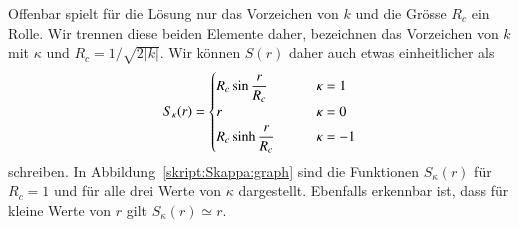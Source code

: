 Offenbar spielt für die Lösung  nur das Vorzeichen von $k$ und die
Grösse $R_c$ ein Rolle.
Wir trennen diese beiden Elemente daher, bezeichnen das Vorzeichen
von $k$ mit $\kappa$ und $R_c = 1/\sqrt{2|k|}$.
Wir können $S(r)$ daher auch etwas einheitlicher als
\begin{equation}
S_\kappa(r) = \begin{cases}
R_c\sin  \displaystyle\frac{\mathstrut r}{R_c} &\qquad \kappa= 1\\
r                                              &\qquad \kappa= 0\\
R_c\sinh \displaystyle\frac{\mathstrut r}{R_c} &\qquad \kappa=-1
\end{cases}
\label{skript:rwmetrik:Skappa}
\end{equation}
schreiben.
In Abbildung~\ref{skript:Skappa:graph} sind die Funktionen $S_\kappa(r)$
für $R_c=1$ und für alle drei Werte von $\kappa$ dargestellt.
Ebenfalls erkennbar ist, dass für kleine Werte von $r$ gilt
$S_\kappa(r)\simeq r$.


